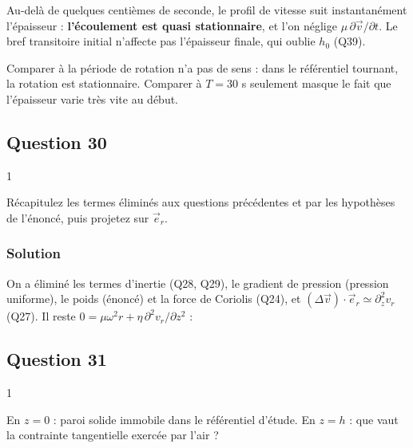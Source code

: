 \documentclass[11pt,a4paper]{article}
\newcommand{\equationajustee}[1]{%
  \sbox{\boiteequation}{$\displaystyle #1$}%
  \ifdim\wd\boiteequation>\linewidth
    \[\resizebox{\linewidth}{!}{\usebox{\boiteequation}}\]%
  \else
    \[#1\]%
  \fi}
\begin{document}
Au-delà de quelques centièmes de seconde, le profil de vitesse suit instantanément l'épaisseur : \textbf{l'écoulement est quasi stationnaire}, et l'on néglige \(\mu\,\partial\vec v/\partial t\). Le bref transitoire initial n'affecte pas l'épaisseur finale, qui oublie \(h_0\) (Q39).

\begin{piege}

Comparer à la période de rotation n'a pas de sens : dans le référentiel tournant, la rotation est stationnaire. Comparer à \(T=30\) s seulement masque le fait que l'épaisseur varie très vite au début.

\end{piege}

\hypertarget{question-30}{%
\subsection{Question 30}\label{question-30}}

\begin{indication}{1}

Récapitulez les termes éliminés aux questions précédentes et par les hypothèses de l'énoncé, puis projetez sur \(\vec e_r\).

\end{indication}

\hypertarget{solution-29}{%
\subsubsection{Solution}\label{solution-29}}

On a éliminé les termes d'inertie (Q28, Q29), le gradient de pression (pression uniforme), le poids (énoncé) et la force de Coriolis (Q24), et \((\Delta\vec v)\cdot\vec e_r\simeq\partial_z^2v_r\) (Q27). Il reste \(0=\mu\omega^2r+\eta\,\partial^2v_r/\partial z^2\) :

\equationajustee{\boxed{\frac{\partial^2v_r}{\partial z^2}=-\frac{\mu\omega^2r}\eta}}

\hypertarget{question-31}{%
\subsection{Question 31}\label{question-31}}

\begin{indication}{1}

En \(z=0\) : paroi solide immobile dans le référentiel d'étude. En \(z=h\) : que vaut la contrainte tangentielle exercée par l'air ?

\end{indication}
\end{document}
